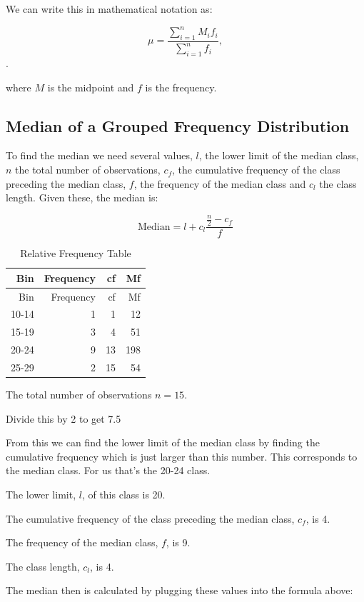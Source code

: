 \documentclass[
]{book}
\begin{document}
We can write this in mathematical notation as:

\[ \mu=\frac{\sum_{i=1}^n M_i f_i}{\sum_{i=1}^n f_i},\].

where \(M\) is the midpoint and \(f\) is the frequency.

\hypertarget{median-of-a-grouped-frequency-distribution}{%
\subsection{Median of a Grouped Frequency Distribution}\label{median-of-a-grouped-frequency-distribution}}

To find the median we need several values, \(l\), the lower limit of the median class, \(n\) the total number of observations, \(c_f\), the cumulative frequency of the class preceding the median class, \(f\), the frequency of the median class and \(c_l\) the class length. Given these, the median is:

\[\textrm{Median}=l + c_l \frac{\frac{n}{2}-c_f}{f} \]

\begin{longtable}[]{@{}rrrr@{}}
\caption{\label{tab:table0000007}Relative Frequency Table}\tabularnewline
\toprule
Bin & Frequency & cf & Mf \\
\midrule
\endfirsthead
\toprule
Bin & Frequency & cf & Mf \\
\midrule
\endhead
10-14 & 1 & 1 & 12 \\
15-19 & 3 & 4 & 51 \\
20-24 & 9 & 13 & 198 \\
25-29 & 2 & 15 & 54 \\
\bottomrule
\end{longtable}

The total number of observations \(n = 15\).

Divide this by 2 to get 7.5

From this we can find the lower limit of the median class by finding the cumulative frequency which is just larger than this number. This corresponds to the median class. For us that's the 20-24 class.

The lower limit, \(l\), of this class is 20.

The cumulative frequency of the class preceding the median class, \(c_f\), is 4.

The frequency of the median class, \(f\), is 9.

The class length, \(c_l\), is 4.

The median then is calculated by plugging these values into the formula above:
\end{document}
